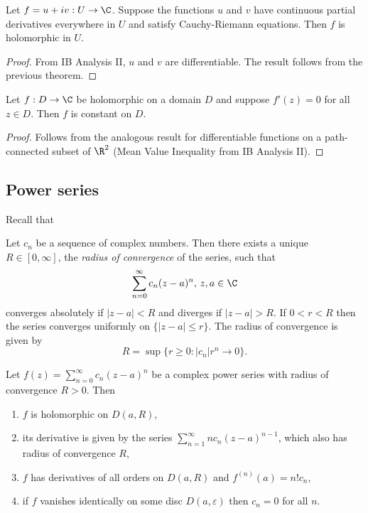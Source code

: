 \documentclass[a4paper]{article}
\begin{document}
\begin{corollary}
  Let \(f = u + iv: U \to \C\). Suppose the functions \(u\) and \(v\) have continuous partial derivatives everywhere in \(U\) and satisfy Cauchy-Riemann equations. Then \(f\) is holomorphic in \(U\).
\end{corollary}

\begin{proof}
  From IB Analysis II, \(u\) and \(v\) are differentiable. The result follows from the previous theorem.
\end{proof}

\begin{corollary}
  Let \(f: D \to \C\) be holomorphic on a domain \(D\) and suppose \(f'(z) = 0\) for all \(z \in D\). Then \(f\) is constant on \(D\).
\end{corollary}

\begin{proof}
  Follows from the analogous result for differentiable functions on a path-connected subset of \(\R^2\) (Mean Value Inequality from IB Analysis II).
\end{proof}

\subsection{Power series}

Recall that

\begin{theorem}
  Let \(c_n\) be a sequence of complex numbers. Then there exists a unique \(R \in [0, \infty]\), the \emph{radius of convergence} of the series, such that
  \[
    \sum_{n = 0}^\infty c_n(z - a)^n,\, z, a \in \C
  \]
  converges absolutely if \(|z - a| < R\) and diverges if \(|z - a| > R\). If \(0 < r < R\) then the series converges uniformly on \(\{|z - a| \leq r\}\). The radius of convergence is given by
  \[
    R = \sup\{r \geq 0: |c_n|r^n \to 0\}.
  \]
\end{theorem}

\begin{theorem}
  Let \(f(z) = \sum_{n = 0}^\infty c_n(z - a)^n\) be a complex power series with radius of convergence \(R > 0\). Then
  \begin{enumerate}
  \item \(f\) is holomorphic on \(D(a, R)\),
  \item its derivative is given by the series \(\sum_{n = 1}^\infty nc_n(z - a)^{n - 1}\), which also has radius of convergence \(R\),
  \item \(f\) has derivatives of all orders on \(D(a, R)\) and \(f^{(n)}(a) = n!c_n\),
  \item if \(f\) vanishes identically on some disc \(D(a, \varepsilon)\) then \(c_n = 0\) for all \(n\).
  \end{enumerate}
\end{theorem}
\end{document}
